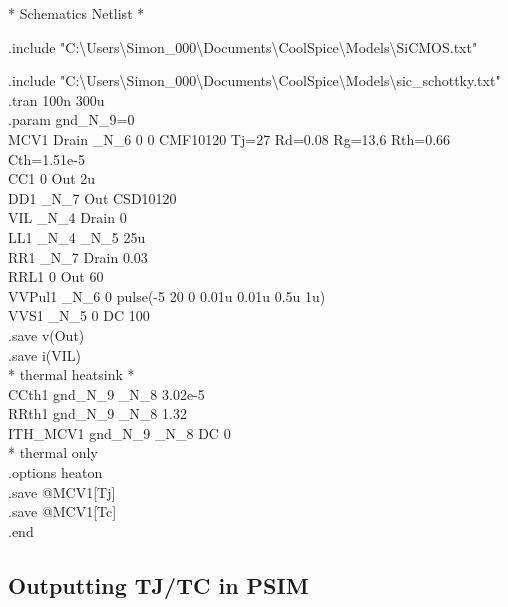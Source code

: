 {\fontsize{10}{12}\selectfont
	* Schematics Netlist * 
	
	.include "C:\textbackslash Users\textbackslash Simon\_000\textbackslash Documents\textbackslash CoolSpice\textbackslash Models\textbackslash SiCMOS.txt"
	
	.include "C:\textbackslash Users\textbackslash Simon\_000\textbackslash Documents\textbackslash CoolSpice\textbackslash Models\textbackslash sic\_schottky.txt" \\
	
	.tran 100n 300u \\
	\indent .param gnd\_N\_9=0 \\
	
	MCV1 Drain \_N\_6 0 0 CMF10120 Tj=27 Rd=0.08 Rg=13.6 Rth=0.66 Cth=1.51e-5 \\
	
	CC1 0 Out 2u \\
	\indent DD1 \_N\_7 Out CSD10120 \\
	\indent VIL \_N\_4 Drain 0 \\
	
	LL1 \_N\_4 \_N\_5 25u \\ 
	\indent RR1 \_N\_7 Drain 0.03 \\
	\indent RRL1 0 Out 60 \\
	
	VVPul1 \_N\_6 0 pulse(-5 20 0 0.01u 0.01u 0.5u 1u) \\
	\indent VVS1 \_N\_5 0 DC 100 \\
	
	.save v(Out) \\
	\indent .save i(VIL) \\
	
	* thermal heatsink * \\
	\indent CCth1 gnd\_N\_9 \_N\_8 3.02e-5 \\
	\indent RRth1 gnd\_N\_9 \_N\_8 1.32 \\
	\indent ITH\_MCV1 gnd\_N\_9 \_N\_8 DC 0 \\
	
	* thermal only \\
	\indent .options heaton \\
	
	.save @MCV1[Tj] \\
	\indent .save @MCV1[Tc] \\
	
	.end
}



\subsection{Outputting TJ/TC in PSIM}






